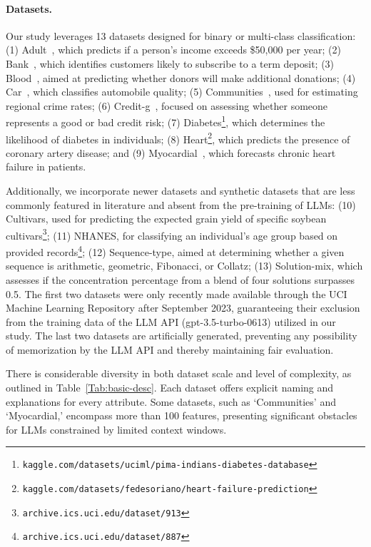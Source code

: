 \paragraph{Datasets.}
Our study leverages 13 datasets designed for binary or multi-class classification: (1) Adult~\cite{asuncion2007uci}, which predicts if a person’s income exceeds \$50,000 per year; (2) Bank~\cite{moro2014data}, which identifies customers likely to subscribe to a term deposit; (3) Blood~\cite{yeh2009knowledge}, aimed at predicting whether donors will make additional donations; (4) Car~\cite{kadra2021well}, which classifies automobile quality; (5) Communities~\cite{misc_communities_and_crime_183}, used for estimating regional crime rates; (6) Credit-g~\cite{kadra2021well}, focused on assessing whether someone represents a good or bad credit risk; (7) Diabetes\footnote{\texttt{kaggle.com/datasets/uciml/pima-indians-diabetes-database}}, which determines the likelihood of diabetes in individuals; (8) Heart\footnote{\texttt{kaggle.com/datasets/fedesoriano/heart-failure-prediction}}, which predicts the presence of coronary artery disease; and (9) Myocardial~\cite{misc_myocardial_infarction_complications_579}, which forecasts chronic heart failure in patients.

Additionally, we incorporate newer datasets and synthetic datasets that are less commonly featured in literature and absent from the pre-training of LLMs: (10) Cultivars, used for predicting the expected grain yield of specific soybean cultivars\footnote{\texttt{archive.ics.uci.edu/dataset/913}}; (11) NHANES, for classifying an individual's age group based on provided records\footnote{\texttt{archive.ics.uci.edu/dataset/887}}; (12) Sequence-type, aimed at determining whether a given sequence is arithmetic, geometric, Fibonacci, or Collatz; (13) Solution-mix, which assesses if the concentration percentage from a blend of four solutions surpasses 0.5. The first two datasets were only recently made available through the UCI Machine Learning Repository after September 2023, guaranteeing their exclusion from the training data of the LLM API (gpt-3.5-turbo-0613) utilized in our study. The last two datasets are artificially generated, preventing any possibility of memorization by the LLM API and thereby maintaining fair evaluation.

There is considerable diversity in both dataset scale and level of complexity, as outlined in Table~\ref{Tab:basic-desc}. Each dataset offers explicit naming and explanations for every attribute. Some datasets, such as `Communities' and `Myocardial,' encompass more than 100 features, presenting significant obstacles for LLMs constrained by limited context windows.

